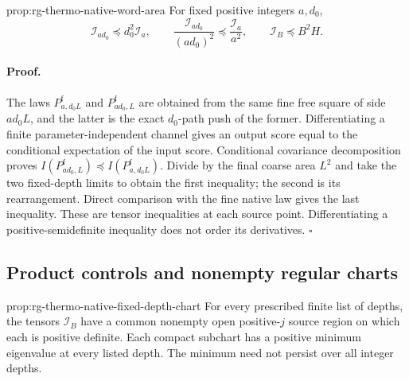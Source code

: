 {prop:rg-thermo-native-word-area}
For fixed positive integers \(a,d_0\),
\begin{equation}
 \mathcal I_{ad_0}\preceq d_0^2\mathcal I_a,
 \qquad
 \frac{\mathcal I_{ad_0}}{(ad_0)^2}\preceq\frac{\mathcal I_a}{a^2},
 \qquad \mathcal I_B\preceq B^2H.
 \label{eq:rg-thermo-native-word-area}
\end{equation}\thermoestablishedstatus


\paragraph{Proof.}
The laws \(P^{\mathrm f}_{a,d_0L}\) and
\(P^{\mathrm f}_{ad_0,L}\) are obtained from the same fine free square
of side \(ad_0L\), and the latter is the exact \(d_0\)-path push of the
former. Differentiating a finite parameter-independent channel gives an
output score equal to the conditional expectation of the input score.
Conditional covariance decomposition proves
\(I(P^{\mathrm f}_{ad_0,L})\preceq I(P^{\mathrm f}_{a,d_0L})\).
Divide by the final coarse area \(L^2\) and take the two fixed-depth
limits to obtain the first inequality; the second is its rearrangement.
Direct comparison with the fine native law gives the last inequality.
These are tensor inequalities at each source point. Differentiating a
positive-semidefinite inequality does not order its derivatives.
\hfill\(\square\)

\subsection{Product controls and nonempty regular charts}
\label{sec:rg-thermo-native-regular-charts}

{prop:rg-thermo-native-fixed-depth-chart}
For every prescribed finite list of depths, the tensors \(\mathcal I_B\)
have a common nonempty open positive-\(j\) source region on which each is
positive definite. Each compact subchart has a positive minimum eigenvalue
at every listed depth. The minimum need not persist over all integer
depths.\thermoestablishedstatus


